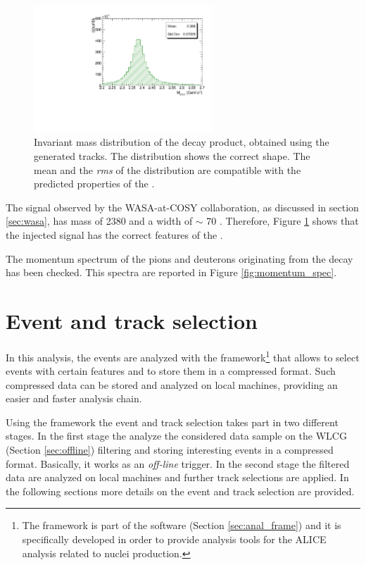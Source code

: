 \begin{figure}
    \centering
    \includegraphics[width=0.6\textwidth]{gfx/valid}
	\caption{Invariant mass distribution of the \dst decay product, obtained using the generated tracks. The distribution shows the correct shape. The mean and the \textit{rms} of the distribution are compatible with the predicted properties of the \dst.}
	\label{fig:valid}
\end{figure}

The signal observed by the WASA-at-COSY collaboration, as discussed in section \ref{sec:wasa}, has
mass of 2380 \mevcs and a width of $\sim$ 70 \mevcs. Therefore, Figure \ref{fig:valid} shows that the
injected signal has the correct features of the \dst.

The momentum spectrum of the pions and deuterons originating from the \ds decay has been checked.
This spectra are reported in Figure \ref{fig:momentum_spec}. 

%
%
\section{Event and track selection} \label{sec:4.2}

In this analysis, the events are analyzed with the  framework\footnote{The  
framework is part of the  software (Section \ref{sec:anal_frame}) and it is 
specifically developed in order to provide analysis tools for the ALICE analysis related to nuclei
production.} that allows to select events with certain features and to store them in a compressed
format.
Such compressed data can be stored and analyzed on local machines, providing an easier and faster 
analysis chain.

Using the  framework the event and track selection takes part in two different stages.
In the first stage the  analyze the considered data sample on the WLCG (Section 
\ref{sec:offline}) filtering and storing interesting events in a compressed format. 
Basically, it works as an \textit{off-line} trigger.
In the second stage the filtered data are analyzed on local machines and further track
selections are applied.
In the following sections more details on the event and track selection are provided.

